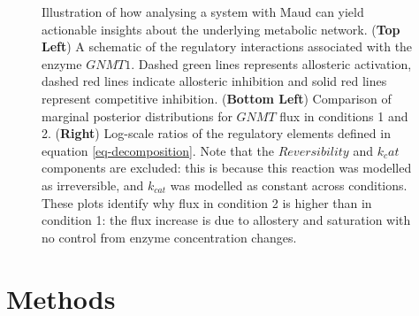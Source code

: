 \documentclass[journal=,manuscript=]{achemso}
\begin{document}
\begin{figure}

\begin{minipage}[t]{\linewidth}

{\centering 


}

\end{minipage}%

\caption{\label{fig-decomposition}Illustration of how analysing a system
with Maud can yield actionable insights about the underlying metabolic
network. (\textbf{Top Left}) A schematic of the regulatory interactions
associated with the enzyme \(GNMT1\). Dashed green lines represents
allosteric activation, dashed red lines indicate allosteric inhibition
and solid red lines represent competitive inhibition. (\textbf{Bottom
Left}) Comparison of marginal posterior distributions for \(GNMT\) flux
in conditions 1 and 2. (\textbf{Right}) Log-scale ratios of the
regulatory elements defined in equation \eqref{eq-decomposition}. Note
that the \(Reversibility\) and \(k_cat\) components are excluded: this
is because this reaction was modelled as irreversible, and \(k_{cat}\)
was modelled as constant across conditions. These plots identify why
flux in condition 2 is higher than in condition 1: the flux increase is
due to allostery and saturation with no control from enzyme
concentration changes.}

\end{figure}

\hypertarget{methods}{%
\section{Methods}\label{methods}}
\end{document}

